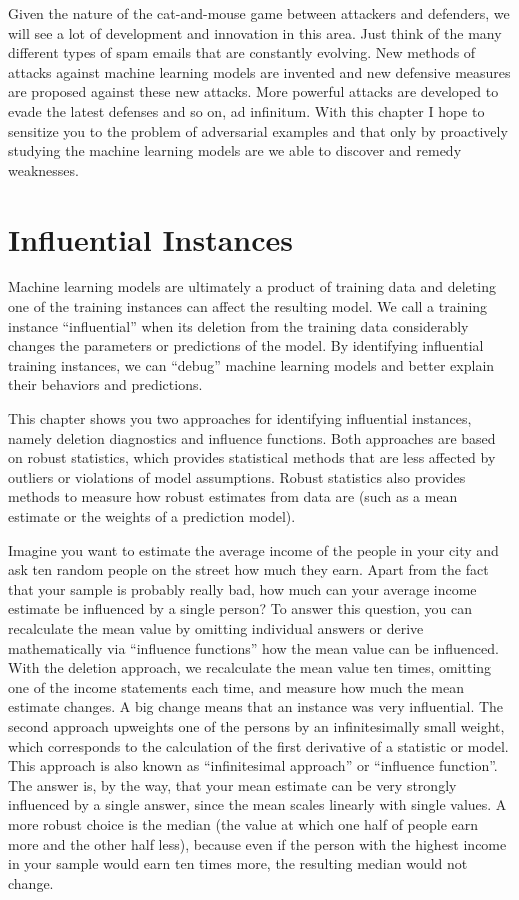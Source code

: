 \documentclass[12pt,]{krantz}
\begin{document}
Given the nature of the cat-and-mouse game between attackers and
defenders, we will see a lot of development and innovation in this area.
Just think of the many different types of spam emails that are
constantly evolving. New methods of attacks against machine learning
models are invented and new defensive measures are proposed against
these new attacks. More powerful attacks are developed to evade the
latest defenses and so on, ad infinitum. With this chapter I hope to
sensitize you to the problem of adversarial examples and that only by
proactively studying the machine learning models are we able to discover
and remedy weaknesses.

\newpage

\hypertarget{influential}{\section{Influential
Instances}\label{influential}}

Machine learning models are ultimately a product of training data and
deleting one of the training instances can affect the resulting model.
We call a training instance ``influential'' when its deletion from the
training data considerably changes the parameters or predictions of the
model. By identifying influential training instances, we can ``debug''
machine learning models and better explain their behaviors and
predictions.

This chapter shows you two approaches for identifying influential
instances, namely deletion diagnostics and influence functions. Both
approaches are based on robust statistics, which provides statistical
methods that are less affected by outliers or violations of model
assumptions. Robust statistics also provides methods to measure how
robust estimates from data are (such as a mean estimate or the weights
of a prediction model).

Imagine you want to estimate the average income of the people in your
city and ask ten random people on the street how much they earn. Apart
from the fact that your sample is probably really bad, how much can your
average income estimate be influenced by a single person? To answer this
question, you can recalculate the mean value by omitting individual
answers or derive mathematically via ``influence functions'' how the
mean value can be influenced. With the deletion approach, we recalculate
the mean value ten times, omitting one of the income statements each
time, and measure how much the mean estimate changes. A big change means
that an instance was very influential. The second approach upweights one
of the persons by an infinitesimally small weight, which corresponds to
the calculation of the first derivative of a statistic or model. This
approach is also known as ``infinitesimal approach'' or ``influence
function''. The answer is, by the way, that your mean estimate can be
very strongly influenced by a single answer, since the mean scales
linearly with single values. A more robust choice is the median (the
value at which one half of people earn more and the other half less),
because even if the person with the highest income in your sample would
earn ten times more, the resulting median would not change.
\end{document}
